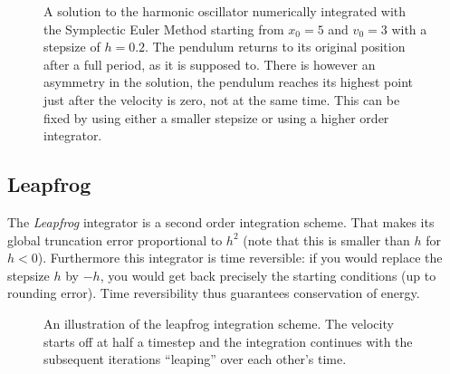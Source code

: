 \documentclass[a4paper]{article}
\begin{document}
\begin{figure}
\caption{A solution to the harmonic oscillator numerically integrated with the Symplectic Euler
  Method starting from $x_{0}=5$ and $v_{0}=3$ with a stepsize of $h=0.2$. The pendulum returns to
  its original position after a full period, as it is supposed to. There is however an asymmetry in
  the solution, the pendulum reaches its highest point just after the velocity is zero, not at the
  same time. This can be fixed by using either a smaller stepsize or using a higher order
  integrator.}
\label{fig:symplectic}
\end{figure}

\subsection{Leapfrog}
\label{sec:leapfrog}
The \textit{Leapfrog} integrator is a second order integration scheme. \cite{leapfrog} That makes
its global truncation error proportional to $h^2$ (note that this is smaller than $h$ for $h<0$).
Furthermore this integrator is time reversible: if you would replace the stepsize $h$ by $-h$, you
would get back precisely the starting conditions (up to rounding error). Time reversibility thus
guarantees conservation of energy.

\begin{figure}
\caption{An illustration of the leapfrog integration scheme. The velocity starts off at half a
  timestep and the integration continues with the subsequent iterations ``leaping'' over each
  other's time.}
\label{fig:leapfrog}
\end{figure}
\end{document}
